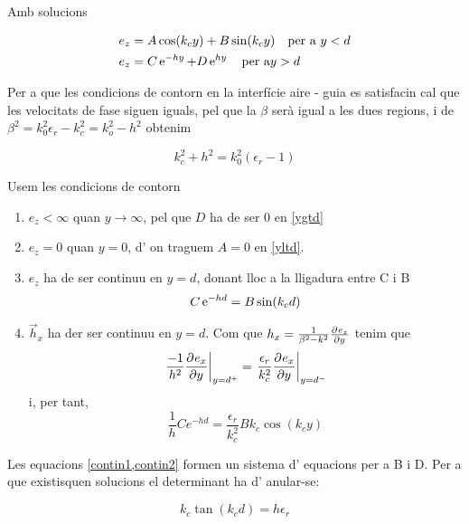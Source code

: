 Amb solucions

\begin{subequations}
  \begin{align}
    e_z &= A \cos(k_cy) + B \sin (k_c y) \quad \text{per a } y < d \label{yltd} \\
    e_z &= C \operatorname{e}^{-hy} + D \operatorname{e}^{hy} \quad \text{per a} y > d \label{ygtd}
  \end{align}
\end{subequations}

Per a que les condicions de contorn en la interfície aire - guia es satisfacin cal que les velocitats de fase siguen iguals, pel que la $\beta$ serà igual a les dues regions, i de $\beta^2 = k_0^2 \epsilon _r - k_c ^2 = k_o^2 - h^2$ obtenim 

\begin{equation}
  k_c^2 + h^2 = k_0 ^2 (\epsilon _r - 1)
  \label{final1}
\end{equation}

Usem les condicions de contorn

\begin{enumerate}
  \item{ $e_z < \infty$ quan $y \to \infty$, pel que $D$ ha de ser $0$ en \cref{ygtd}}
  \item{$e_z = 0$ quan $y=0$, d' on traguem $A = 0$ en \cref{yltd}.}
  \item{$e_z$ ha de ser continuu en $y=d$, donant lloc a la lligadura entre C i B
  \begin{equation}
    C \operatorname{e}^{-hd}=B\sin(k_c d) \label{contin1}
  \end{equation}}
  \item{$\vec h_x$ ha der ser continuu en $y=d$. Com que $h_x = \frac{1}{\beta^2 - k^2}\frac{\partial ^{} e_z}{\partial y ^{}}$ tenim que
  \begin{equation}
   \left. \frac{-1}{h ^2} \frac{\partial ^{} e_x}{\partial y ^{}} \right \vert _{y = d^+} = \left . \frac{\epsilon _r}{k_c ^2} \frac{\partial ^{} e_x}{\partial y ^{}} \right \vert _{y = d^-}
  \end{equation}
  i, per tant,
  \begin{equation}
    \frac{1}{h} C e^{-hd} = \frac{\epsilon _r}{k_c ^2} B k_c \cos (k_c y) \label{contin2}
  \end{equation}
  }
\end{enumerate}

Les equacions \cref{contin1,contin2} formen un sistema d' equacions per a B i D. Per a que existisquen solucions el determinant ha d' anular-se:

\begin{equation}
  k_c \tan (k_c d) = h \epsilon_r
  \label{final2}
\end{equation}


